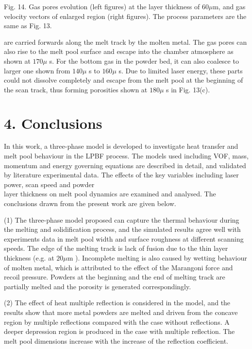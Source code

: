 \documentclass[10pt]{article}
\begin{document}
Fig. 14. Gas pores evolution (left figures) at the layer thickness of $60 \mu \mathrm{m}$, and gas velocity vectors of enlarged region (right figures). The process parameters are the same as Fig. 13.

are carried forwards along the melt track by the molten metal. The gas pores can also rise to the melt pool surface and escape into the chamber atmosphere as shown at $170 \mu$ s. For the bottom gas in the powder bed, it can also coalesce to larger one shown from $140 \mu$ s to $160 \mu$ s. Due to limited laser energy, these parts could not dissolve completely and escape from the melt pool at the beginning of the scan track, thus forming porosities shown at $180 \mu$ s in Fig. 13(c).

\section*{4. Conclusions}
In this work, a three-phase model is developed to investigate heat transfer and melt pool behaviour in the LPBF process. The models used including VOF, mass, momentum and energy governing equations are described in detail, and validated by literature experimental data. The effects of the key variables including laser power, scan speed and powder\\
layer thickness on melt pool dynamics are examined and analysed. The conclusions drawn from the present work are given below.

(1) The three-phase model proposed can capture the thermal behaviour during the melting and solidification process, and the simulated results agree well with experiments data in melt pool width and surface roughness at different scanning speeds. The edge of the melting track is lack of fusion due to the thin layer thickness (e.g. at $20 \mu \mathrm{m}$ ). Incomplete melting is also caused by wetting behaviour of molten metal, which is attributed to the effect of the Marangoni force and recoil pressure. Powders at the beginning and the end of melting track are partially melted and the porosity is generated correspondingly.

(2) The effect of heat multiple reflection is considered in the model, and the results show that more metal powders are melted and driven from the concave region by multiple reflections compared with the case without reflections. A deeper depression region is produced in the case with multiple reflection. The melt pool dimensions increase with the increase of the reflection coefficient.
\end{document}

